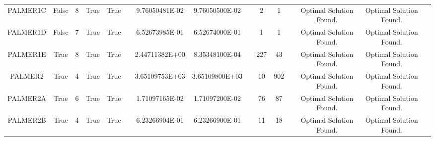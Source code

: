 \begin{longtable}{ccccccccccccccc}
	\cellcolor{default2} PALMER1C& \cellcolor{default2} False& \cellcolor{default2} 8& \cellcolor{default2} True& \cellcolor{default2} True& \cellcolor{header} & \cellcolor{best} 9.76050481E-02& \cellcolor{ok} 9.76050500E-02& \cellcolor{header} & \cellcolor{ok} 2& \cellcolor{best} 1& \cellcolor{header} & \cellcolor{default2} Optimal Solution Found.& \cellcolor{default2} Optimal Solution Found.& \cellcolor{header} \\
	\cellcolor{default1} PALMER1D& \cellcolor{default1} False& \cellcolor{default1} 7& \cellcolor{default1} True& \cellcolor{default1} True& \cellcolor{header} & \cellcolor{best} 6.52673985E-01& \cellcolor{ok} 6.52674000E-01& \cellcolor{header} & \cellcolor{best} 1& \cellcolor{best} 1& \cellcolor{header} & \cellcolor{default1} Optimal Solution Found.& \cellcolor{default1} Optimal Solution Found.& \cellcolor{header} \\
	\cellcolor{default2} PALMER1E& \cellcolor{default2} True& \cellcolor{default2} 8& \cellcolor{default2} True& \cellcolor{default2} True& \cellcolor{header} & \cellcolor{poor} 2.44711382E+00& \cellcolor{best} 8.35348100E-04& \cellcolor{header} & \cellcolor{poor} 227& \cellcolor{best} 43& \cellcolor{header} & \cellcolor{default2} Optimal Solution Found.& \cellcolor{default2} Optimal Solution Found.& \cellcolor{header} \\
	\cellcolor{default1} PALMER2& \cellcolor{default1} True& \cellcolor{default1} 4& \cellcolor{default1} True& \cellcolor{default1} True& \cellcolor{header} & \cellcolor{best} 3.65109753E+03& \cellcolor{ok} 3.65109800E+03& \cellcolor{header} & \cellcolor{best} 10& \cellcolor{poor} 902& \cellcolor{header} & \cellcolor{default1} Optimal Solution Found.& \cellcolor{default1} Optimal Solution Found.& \cellcolor{header} \\
	\cellcolor{default2} PALMER2A& \cellcolor{default2} True& \cellcolor{default2} 6& \cellcolor{default2} True& \cellcolor{default2} True& \cellcolor{header} & \cellcolor{best} 1.71097165E-02& \cellcolor{ok} 1.71097200E-02& \cellcolor{header} & \cellcolor{best} 76& \cellcolor{ok} 87& \cellcolor{header} & \cellcolor{default2} Optimal Solution Found.& \cellcolor{default2} Optimal Solution Found.& \cellcolor{header} \\
	\cellcolor{default1} PALMER2B& \cellcolor{default1} True& \cellcolor{default1} 4& \cellcolor{default1} True& \cellcolor{default1} True& \cellcolor{header} & \cellcolor{ok} 6.23266904E-01& \cellcolor{best} 6.23266900E-01& \cellcolor{header} & \cellcolor{best} 11& \cellcolor{ok} 18& \cellcolor{header} & \cellcolor{default1} Optimal Solution Found.& \cellcolor{default1} Optimal Solution Found.& \cellcolor{header} \\

\end{longtable}
